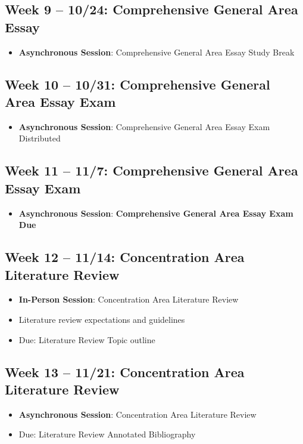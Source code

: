 \documentclass[12pt, letterpaper]{article}
\begin{document}
\subsection*{Week 9 -- 10/24: Comprehensive General Area Essay}
\begin{itemize}
    \item \textbf{Asynchronous Session}: Comprehensive General Area Essay Study Break
\end{itemize}


\subsection*{Week 10 -- 10/31: Comprehensive General Area Essay Exam}
\begin{itemize}
    \item \textbf{Asynchronous Session}: Comprehensive General Area Essay Exam Distributed
\end{itemize}   

\subsection*{Week 11 -- 11/7: Comprehensive General Area Essay Exam}
\begin{itemize}
    \item \textbf{Asynchronous Session}: \textbf{Comprehensive General Area Essay Exam Due}
\end{itemize}

\subsection*{Week 12 -- 11/14: Concentration Area Literature Review}
\begin{itemize}
    \item \textbf{In-Person Session}: Concentration Area Literature Review
    \item Literature review expectations and guidelines
    \item Due: Literature Review Topic outline
\end{itemize}

\subsection*{Week 13 -- 11/21: Concentration Area Literature Review}
\begin{itemize}
    \item \textbf{Asynchronous Session}: Concentration Area Literature Review
    \item Due: Literature Review Annotated Bibliography
\end{itemize}
\end{document}
